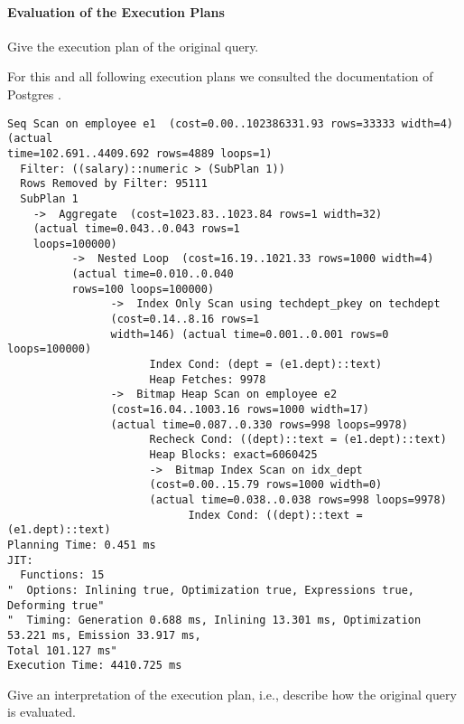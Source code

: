 \documentclass[11pt]{scrartcl}
\begin{document}
    \paragraph{Evaluation of the Execution Plans}

    Give the execution plan of the original query.

    For this and all following execution plans we consulted the documentation of Postgres \cite{PostgreSQL2023Explain}.

            {\small
    \parskip0pt\begin{verbatim}
Seq Scan on employee e1  (cost=0.00..102386331.93 rows=33333 width=4) (actual 
time=102.691..4409.692 rows=4889 loops=1)
  Filter: ((salary)::numeric > (SubPlan 1))
  Rows Removed by Filter: 95111
  SubPlan 1
    ->  Aggregate  (cost=1023.83..1023.84 rows=1 width=32)
    (actual time=0.043..0.043 rows=1
    loops=100000)
          ->  Nested Loop  (cost=16.19..1021.33 rows=1000 width=4)
          (actual time=0.010..0.040
          rows=100 loops=100000)
                ->  Index Only Scan using techdept_pkey on techdept
                (cost=0.14..8.16 rows=1
                width=146) (actual time=0.001..0.001 rows=0 loops=100000)
                      Index Cond: (dept = (e1.dept)::text)
                      Heap Fetches: 9978
                ->  Bitmap Heap Scan on employee e2
                (cost=16.04..1003.16 rows=1000 width=17)
                (actual time=0.087..0.330 rows=998 loops=9978)
                      Recheck Cond: ((dept)::text = (e1.dept)::text)
                      Heap Blocks: exact=6060425
                      ->  Bitmap Index Scan on idx_dept
                      (cost=0.00..15.79 rows=1000 width=0)
                      (actual time=0.038..0.038 rows=998 loops=9978)
                            Index Cond: ((dept)::text = (e1.dept)::text)
Planning Time: 0.451 ms
JIT:
  Functions: 15
"  Options: Inlining true, Optimization true, Expressions true, Deforming true"
"  Timing: Generation 0.688 ms, Inlining 13.301 ms, Optimization 53.221 ms, Emission 33.917 ms, 
Total 101.127 ms"
Execution Time: 4410.725 ms
    \end{verbatim}}

    Give an interpretation of the execution plan, i.e., describe how the original query is evaluated.
\end{document}
